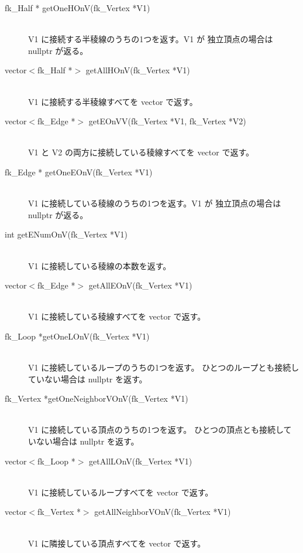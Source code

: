 \begin{description}
 \item[\hspace*{0.6cm}fk\_Half * getOneHOnV(fk\_Vertex *V1)] ~ \\
	V1 に接続する半稜線のうちの1つを返す。V1 が
	独立頂点の場合は nullptr が返る。

 \item[\hspace*{0.6cm}vector\(<\)fk\_Half *\(>\)
	getAllHOnV(fk\_Vertex *V1)] ~ \\
	V1 に接続する半稜線すべてを vector で返す。

 \item[\hspace*{0.6cm}vector\(<\)fk\_Edge *\(>\)
	getEOnVV(fk\_Vertex *V1, fk\_Vertex *V2)] ~ \\
	V1 と V2 の両方に接続している稜線すべてを
	vector で返す。		

 \item[\hspace*{0.6cm}fk\_Edge * getOneEOnV(fk\_Vertex *V1)] ~ \\
	V1 に接続している稜線のうちの1つを返す。V1 が
	独立頂点の場合は nullptr が返る。

 \item[\hspace*{0.6cm}int getENumOnV(fk\_Vertex *V1)] ~ \\
	V1 に接続している稜線の本数を返す。

 \item[\hspace*{0.6cm}vector\(<\)fk\_Edge *\(>\)
	getAllEOnV(fk\_Vertex *V1)] ~ \\
	V1 に接続している稜線すべてを vector で返す。

 \item[\hspace*{0.6cm}fk\_Loop *getOneLOnV(fk\_Vertex *V1)] ~ \\
	V1 に接続しているループのうちの1つを返す。
	ひとつのループとも接続していない場合は nullptr を返す。

 \item[\hspace*{0.6cm}fk\_Vertex *getOneNeighborVOnV(fk\_Vertex *V1)] ~ \\
	V1 に接続している頂点のうちの1つを返す。
	ひとつの頂点とも接続していない場合は nullptr を返す。

 \item[\hspace*{0.6cm}vector\(<\)fk\_Loop *\(>\)
	getAllLOnV(fk\_Vertex *V1)] ~ \\
	V1 に接続しているループすべてを vector で返す。

 \item[\hspace*{0.6cm}vector\(<\)fk\_Vertex *\(>\)
	getAllNeighborVOnV(fk\_Vertex *V1)] ~ \\
	V1 に隣接している頂点すべてを vector で返す。

\end{description}
